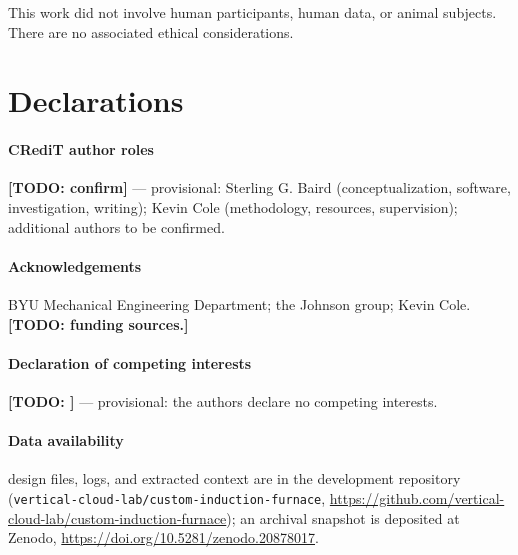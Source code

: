 \documentclass[5p,times]{elsarticle}
\newcommand{\todo}[1]{{\color{red}\textbf{[TODO: #1]}}}
\begin{document}
This work did not involve human participants, human data, or animal subjects. There
are no associated ethical considerations.

\section*{Declarations}

\paragraph{CRediT author roles} \todo{confirm} --- provisional: Sterling G. Baird
(conceptualization, software, investigation, writing); Kevin Cole (methodology,
resources, supervision); additional authors to be confirmed.

\paragraph{Acknowledgements} BYU Mechanical Engineering Department; the Johnson group;
Kevin Cole. \todo{funding sources.}

\paragraph{Declaration of competing interests} \todo{} --- provisional: the authors
declare no competing interests.

\paragraph{Data availability} design files, logs, and extracted context are in the
development repository (\texttt{vertical-cloud-lab/custom-induction-furnace},
\url{https://github.com/vertical-cloud-lab/custom-induction-furnace}); an archival
snapshot is deposited at Zenodo,
\href{https://doi.org/10.5281/zenodo.20878017}{https://doi.org/10.5281/zenodo.20878017}.



\end{document}
